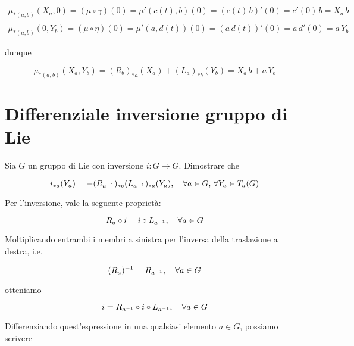 \begin{gather}
	\mu_{*(a,b)}(X_{a}, 0) = \dot{ (\mu \circ \gamma) }(0) %
	= \mu'(c(t), b)(0) %
	= (c(t) \, b)'(0) %
	= c'(0) \, b %
	= X_{a} \, b \\
	\mu_{*(a,b)}(0, Y_{b}) = \dot{ (\mu \circ \eta) }(0) %
	= \mu'(a, d(t))(0) %
	= (a \, d(t))'(0) %
	= a \, d'(0) %
	= a \, Y_{b}
\end{gather}

dunque

\begin{equation}
	\mu_{*(a,b)}(X_{a},Y_{b}) = (R_{b})_{*a}(X_{a}) + (L_{a})_{*b}(Y_{b}) %
	= X_{a} \, b + a \, Y_{b}
\end{equation}

%

\newpage

%

\section{Differenziale inversione gruppo di Lie}\label{es3-8}

\begin{tcolorbox}
	Sia $ G $ un gruppo di Lie con inversione $ i : G \to G $. Dimostrare che
	
	\begin{equation}
		i_{*a}(Y_{a}) = -(R_{a^{-1}})_{*e}(L_{a^{-1}})_{*a} (Y_{a}) %
		\qcomma \forall a \in G, \, \forall Y_{a} \in T_{a}(G)
	\end{equation}
\end{tcolorbox}

Per l'inversione, vale la seguente proprietà:

\begin{equation}
	R_{a} \circ i = i \circ L_{a^{-1}} \qcomma \forall a \in G
\end{equation}

Moltiplicando entrambi i membri a sinistra per l'inversa della traslazione a destra, i.e.

\begin{equation}
	(R_{a})^{-1} = R_{a^{-1}} \qcomma \forall a \in G
\end{equation}

otteniamo

\begin{equation}
	i = R_{a^{-1}} \circ i \circ L_{a^{-1}} \qcomma \forall a \in G
\end{equation}

Differenziando quest'espressione in una qualsiasi elemento $ a \in G $, possiamo scrivere

